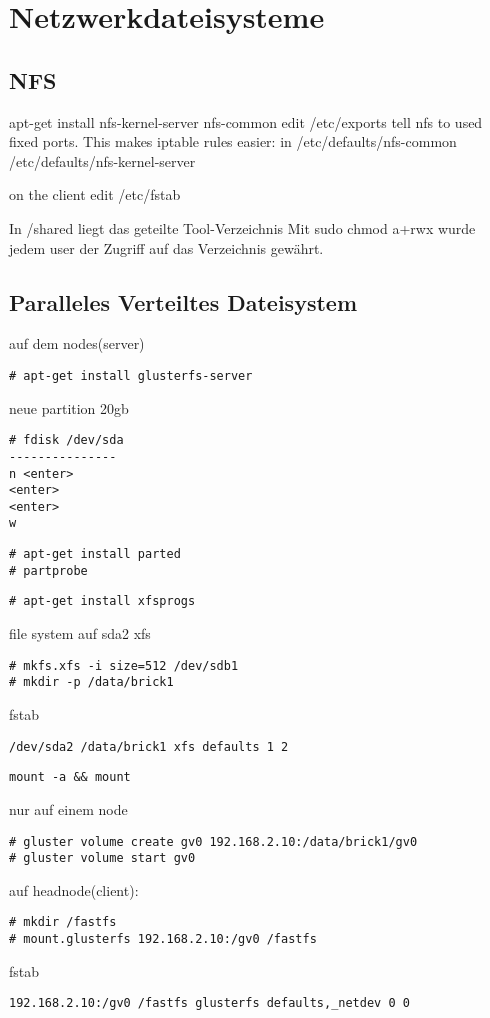 \chapter{Netzwerkdateisysteme}
\section{NFS}
apt-get install nfs-kernel-server nfs-common
edit /etc/exports
tell nfs to used fixed ports. This makes iptable rules easier:
in /etc/defaults/nfs-common
/etc/defaults/nfs-kernel-server

on the client edit /etc/fstab

In /shared liegt das geteilte Tool-Verzeichnis
Mit sudo chmod a+rwx wurde jedem user der Zugriff auf das Verzeichnis gewährt.

\section{Paralleles Verteiltes Dateisystem}
auf dem nodes(server)
\begin{lstlisting}[style=Bash]
# apt-get install glusterfs-server
\end{lstlisting}
neue partition 20gb
\begin{lstlisting}[style=Bash]
# fdisk /dev/sda
---------------
n <enter>
<enter>
<enter>
w
\end{lstlisting}
\begin{lstlisting}[style=Bash]
# apt-get install parted
# partprobe
\end{lstlisting}
\begin{lstlisting}[style=Bash]
# apt-get install xfsprogs
\end{lstlisting}

file system auf sda2 xfs
\begin{lstlisting}[style=Bash]
# mkfs.xfs -i size=512 /dev/sdb1
# mkdir -p /data/brick1
\end{lstlisting}
fstab
\begin{lstlisting}[style=Bash]
/dev/sda2 /data/brick1 xfs defaults 1 2
\end{lstlisting}
\begin{lstlisting}[style=Bash]
mount -a && mount
\end{lstlisting}
nur auf einem node
\begin{lstlisting}[style=Bash]
# gluster volume create gv0 192.168.2.10:/data/brick1/gv0
# gluster volume start gv0
\end{lstlisting}

auf headnode(client):
\begin{lstlisting}[style=Bash]
# mkdir /fastfs 
# mount.glusterfs 192.168.2.10:/gv0 /fastfs
\end{lstlisting}
fstab
\begin{lstlisting}[style=Bash]
192.168.2.10:/gv0 /fastfs glusterfs defaults,_netdev 0 0
\end{lstlisting}
